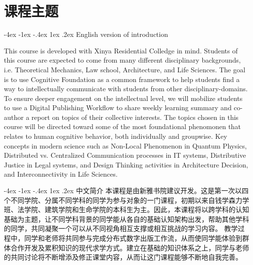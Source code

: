 \documentclass[11pt,fleqn]{book}
\makeatletter
\numberwithin{dummy}{section}
\theoremstyle{ocrenumbox}
\theoremstyle{blacknumex}
\theoremstyle{blacknumbox}
\theoremstyle{ocrenum}
\renewcommand{\section}{\@startsection{section}{1}{\z@}
	{-4ex \@plus -1ex \@minus -.4ex}
	{1ex \@plus.2ex }
	{\normalfont\large\sffamily\bfseries}}
\newif\ifusechapterimage
\newcommand{\thechapterimage}{}%
\newcommand{\chapterimage}[1]{\ifusechapterimage\renewcommand{\thechapterimage}{#1}\fi}%
\makeatother
\begin{document}
\pagestyle{fancy} %




\chapterimage{chapter_head_2.pdf} %

\chapter{课程主题}

\section{English version of introduction}

This course is developed with Xinya Residential Colledge in mind. Students of this course are expected to come from many different disciplinary backgrounds, i.e. Theoretical Mechanics, Law school, Architecture, and Life Sciences. The goal is to use Cognitive Foundation as a common framework to help students find a way to intellectually communicate with students from other disciplinary-domains. To ensure deeper engagement on the intellectual level, we will mobilize students to use a Digital Publishing Workflow to share weekly learning summary and co-author a report on topics of their collective interests. The topics chosen in this course will be directed toward some of the most foundational phenomonen that relates to human cognitive behavior, both individually and groupwise. Key concepts in modern science such as Non-Local Phenomenon in Quantum Physics, Distributed vs. Centralized Communication processes in IT systems, Distributive Justice in Legal systems, and Design Thinking activities in Architecture Decision, and Interconnectivity in Life Sciences.

\section{中文简介}
本课程是由新雅书院建议开发。这是第一次以四个不同学院、分属不同学科的同学为参与对象的一门课程，初期以来自钱学森力学班、法学院、建筑学院和生命学院的本科生为主。因此，本课程将以跨学科的认知基础为主题，让不同学科背景的同学能从各自的基础认知架构出发，帮助其他学科的同学，共同凝聚一个可以从不同视角相互支撑或相互挑战的学习内容。 教学过程中，同学和老师将共同参与完成分布式数字出版工作流，从而使同学能体验到群体合作开发及累积知识的现代求学方式。建立在基础的知识体系之上，同学与老师的共同讨论将不断增添及修正课堂内容，从而让这门课程能够不断地自我完善。
\end{document}
